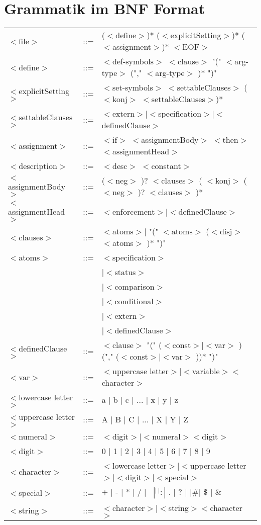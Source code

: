 
\chapter{Grammatik im BNF Format} %

\label{Grammatik} %



\begin{tabular}{lll}
$<$file$>$ 		&::=& ($<$define$>$)* ($<$explicitSetting$>$)* ($<$assignment$>$)*  $<$EOF$>$\\
$<$define$>$ 		&::=& $<$def-symbols$>$ $<$clause$>$ "(" $<$arg-type$>$ ("," $<$arg-type$>$ )* ")" \\
$<$explicitSetting$>$ 	&::=& $<$set-symbols$>$ $<$settableClauses$>$ ($<$konj$>$ $<$settableClauses$>$)* \\
$<$settableClauses$>$	&::=& $<$extern$>|<$specification$>|<$definedClause$>$ \\
$<$assignment$>$ 	&::=& $<$if$>$ $<$assignmentBody$>$ $<$then$>$ $<$assignmentHead$>$ \\
$<$description$>$ 	&::=& $<$desc$>$  $<$constant$>$ \\
$<$assignmentBody$>$  	&::=& ($<$neg$>$ )? $<$clauses$>$  ( $<$konj$>$  ($<$neg$>$ )? $<$clauses$>$ )* \\
$<$assignmentHead$>$ 	&::=& $<$enforcement$>|<$definedClause$>$\\
$<$clauses$>$ 		&::=& $<$atoms$>|$ "(" $<$atoms$>$  ($<$disj$>$  $<$atoms$>$ )* ")"\\
$<$atoms$>$ 		&::=& $<$specification$>$ 	\\	
			&&	$| <$status$>$ \\
			&&	$| <$comparison$>$ \\
			&&	$| <$conditional$>$ \\
			&&	$| <$extern$>$ \\
			&&	$| <$definedClause$>$ \\
$<$definedClause$>$ 	&::=& $<$clause$>$  "(" ($<$const$>|<$var$>$ ) ("," ($<$const$>|<$var$>$ ))* ")"\\
\hline
$<$var$>$ 		&::=& $<$uppercase letter$> | <$variable$> <$character$>$\\
$<$lowercase letter$>$  &::=& a $|$ b $|$ c $|$ ... $|$ x $|$ y $|$ z\\
$<$uppercase letter$>$  &::=& A $|$ B $|$ C $|$ ... $|$ X $|$ Y $|$ Z \\
$<$numeral$>$  		&::=& $<$digit$> | <$numeral$> <$digit$>$\\
$<$digit$>$  		&::=& 0 $|$ 1 $|$ 2 $|$ 3 $|$ 4 $|$ 5 $|$ 6 $|$ 7 $|$ 8 $|$ 9\\
$<$character$>$  	&::=& $<$lowercase letter$> | <$uppercase letter$> | <$digit$> | <$special$>$\\
$<$special$>$  		&::=& + $|$ - $|$ * $|$ / $|$ \ $| ^ | ~ | : |$ . $|$ ? $|$  $| \# |$ \$ $|$ \&\\
$<$string$>$  		&::=& $<$character$> | <$string$> <$character$>$
\end{tabular}


